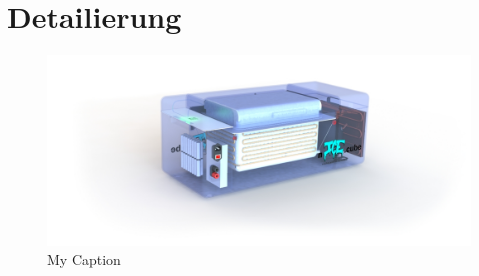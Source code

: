 \chapter{Detailierung}
	\begin{figure}[h]
		\centering
		\includegraphics[width=\textwidth]{assets/transp6_edit.JPG}
		\caption{My Caption}
		\label{fig:transparent render}
	\end{figure}
